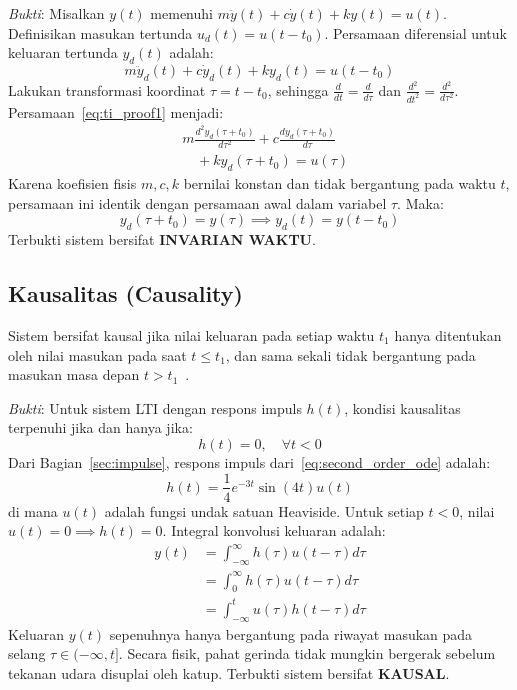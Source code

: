 \documentclass[journal]{IEEEtran}
\begin{document}
\textit{Bukti}: Misalkan $y(t)$ memenuhi $m \ddot{y}(t) + c \dot{y}(t) + k y(t) = u(t)$. Definisikan masukan tertunda $u_d(t) = u(t - t_0)$. Persamaan diferensial untuk keluaran tertunda $y_d(t)$ adalah:
\begin{equation}
    m \ddot{y}_d(t) + c \dot{y}_d(t) + k y_d(t) = u(t - t_0)
    \label{eq:ti_proof1}
\end{equation}
Lakukan transformasi koordinat $\tau = t - t_0$, sehingga $\frac{d}{dt} = \frac{d}{d\tau}$ dan $\frac{d^2}{dt^2} = \frac{d^2}{d\tau^2}$. Persamaan~\eqref{eq:ti_proof1} menjadi:
\begin{align}
    &m \frac{d^2 y_d(\tau + t_0)}{d\tau^2} + c \frac{d y_d(\tau + t_0)}{d\tau} \nonumber \\
    &\quad + k y_d(\tau + t_0) = u(\tau)
    \label{eq:ti_proof2}
\end{align}
Karena koefisien fisis $m, c, k$ bernilai konstan dan tidak bergantung pada waktu $t$, persamaan ini identik dengan persamaan awal dalam variabel $\tau$. Maka:
\begin{equation}
    y_d(\tau + t_0) = y(\tau) \implies y_d(t) = y(t - t_0)
\end{equation}
Terbukti sistem bersifat \textbf{INVARIAN WAKTU}.

\subsection{Kausalitas (Causality)}
Sistem bersifat kausal jika nilai keluaran pada setiap waktu $t_1$ hanya ditentukan oleh nilai masukan pada saat $t \le t_1$, dan sama sekali tidak bergantung pada masukan masa depan $t > t_1$~\cite{oppenheim1997signals,chen2013linear}.

\textit{Bukti}: Untuk sistem LTI dengan respons impuls $h(t)$, kondisi kausalitas terpenuhi jika dan hanya jika:
\begin{equation}
    h(t) = 0, \quad \forall t < 0
    \label{eq:causality_cond}
\end{equation}
Dari Bagian~\ref{sec:impulse}, respons impuls dari~\eqref{eq:second_order_ode} adalah:
\begin{equation}
    h(t) = \frac{1}{4} e^{-3t} \sin(4t) u(t)
    \label{eq:h_causal}
\end{equation}
di mana $u(t)$ adalah fungsi undak satuan Heaviside. Untuk setiap $t < 0$, nilai $u(t) = 0 \implies h(t) = 0$. Integral konvolusi keluaran adalah:
\begin{align}
    y(t) &= \int_{-\infty}^\infty h(\tau) u(t - \tau) d\tau \nonumber \\
    &= \int_0^\infty h(\tau) u(t - \tau) d\tau \nonumber \\
    &= \int_{-\infty}^t u(\tau) h(t - \tau) d\tau
    \label{eq:causal_conv}
\end{align}
Keluaran $y(t)$ sepenuhnya hanya bergantung pada riwayat masukan pada selang $\tau \in (-\infty, t]$. Secara fisik, pahat gerinda tidak mungkin bergerak sebelum tekanan udara disuplai oleh katup. Terbukti sistem bersifat \textbf{KAUSAL}.
\end{document}
